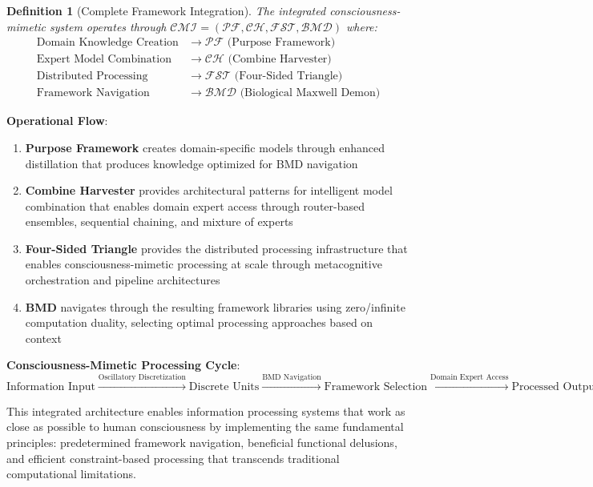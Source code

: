 \documentclass[12pt,a4paper]{article}
\newtheorem{definition}[theorem]{Definition}
\begin{document}
\begin{definition}[Complete Framework Integration]
The integrated consciousness-mimetic system operates through $\mathcal{CMI} = (\mathcal{PF}, \mathcal{CH}, \mathcal{FST}, \mathcal{BMD})$ where:
\begin{align}
\text{Domain Knowledge Creation} &\rightarrow \mathcal{PF} \text{ (Purpose Framework)} \\
\text{Expert Model Combination} &\rightarrow \mathcal{CH} \text{ (Combine Harvester)} \\
\text{Distributed Processing} &\rightarrow \mathcal{FST} \text{ (Four-Sided Triangle)} \\
\text{Framework Navigation} &\rightarrow \mathcal{BMD} \text{ (Biological Maxwell Demon)}
\end{align}
\end{definition}

\textbf{Operational Flow}:
\begin{enumerate}
\item \textbf{Purpose Framework} creates domain-specific models through enhanced distillation that produces knowledge optimized for BMD navigation
\item \textbf{Combine Harvester} provides architectural patterns for intelligent model combination that enables domain expert access through router-based ensembles, sequential chaining, and mixture of experts
\item \textbf{Four-Sided Triangle} provides the distributed processing infrastructure that enables consciousness-mimetic processing at scale through metacognitive orchestration and pipeline architectures
\item \textbf{BMD} navigates through the resulting framework libraries using zero/infinite computation duality, selecting optimal processing approaches based on context
\end{enumerate}

\textbf{Consciousness-Mimetic Processing Cycle}:
$$\text{Information Input} \xrightarrow{\text{Oscillatory Discretization}} \text{Discrete Units} \xrightarrow{\text{BMD Navigation}} \text{Framework Selection} \xrightarrow{\text{Domain Expert Access}} \text{Processed Output}$$

This integrated architecture enables information processing systems that work as close as possible to human consciousness by implementing the same fundamental principles: predetermined framework navigation, beneficial functional delusions, and efficient constraint-based processing that transcends traditional computational limitations.
\end{document}
